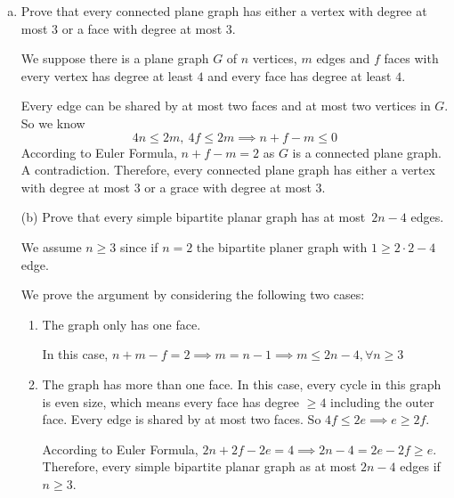 \documentclass[11pt]{article}
\begin{document}
\begin{enumerate}[(a)]\itemsep0pt
  \item
    Prove that every connected plane graph has either a vertex with degree at most \(3\) or a face
    with degree at most \(3\).

\begin{solution}
  We suppose there is a plane graph \(G\) of \(n\) vertices, \(m\) edges and \(f\) faces with every vertex has degree at least \(4\) and every face has degree at least \(4\).

  Every edge can be shared by at most two faces and at most two vertices in \(G\). So we know
  \[4n\le 2m,\:4f\le 2m\implies n+f-m\le 0\]
  According to Euler Formula, \(n+f-m=2\) as \(G\) is a connected plane graph. A contradiction. Therefore, every connected plane graph has either a vertex with degree at most \(3\) or a grace with degree at most \(3\).
\end{solution}

  \item[(b)]
    Prove that every simple bipartite planar graph has at most~\(2n - 4\) edges.

\begin{solution}
  We assume \(n\ge 3\) since if \(n=2\) the bipartite planer graph with \(1\ge 2\cdot 2-4\) edge.

  We prove the argument by considering the following two cases:
  \begin{enumerate}[1)]\itemsep0pt
  \item The graph only has one face.

    In this case, \(n+m-f=2\implies m=n-1\implies m\le 2n-4, \forall n\ge 3\)
  \item The graph has more than one face.
    In this case, every cycle in this graph is even size, which means every face has degree \(\ge 4\) including the outer face.
    Every edge is shared by at most two faces.
    So \(4f\le 2e\implies e\ge 2f\).

    According to Euler Formula, \(2n+2f-2e=4\implies 2n-4=2e-2f\ge e\).
    Therefore, every simple bipartite planar graph as at most \(2n-4\) edges if \(n\ge 3\).
  \end{enumerate}
\end{solution}
\end{enumerate}
\end{document}
